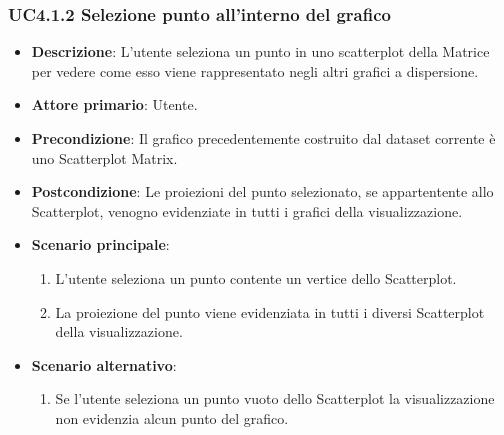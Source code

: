 \subsubsection{UC4.1.2 Selezione punto all'interno del grafico}
\label{subsec:uc4.1.1}
\begin{itemize}
    \item \textbf{Descrizione}: L'utente seleziona un punto in uno scatterplot della Matrice per vedere come 
                                esso viene rappresentato negli altri grafici a dispersione.
	
    \item \textbf{Attore primario}: Utente.
    
    \item \textbf{Precondizione}:   Il grafico precedentemente costruito dal dataset corrente è uno Scatterplot Matrix.
    \item \textbf{Postcondizione}:  Le proiezioni del punto selezionato, se appartentente allo Scatterplot, 
                                    venogno evidenziate in tutti i grafici della visualizzazione.

	\item \textbf{Scenario principale}:
        \begin{enumerate}
            \item L'utente seleziona un punto contente un vertice dello Scatterplot.
            \item La proiezione del punto viene evidenziata in tutti i diversi Scatterplot della visualizzazione.
        \end{enumerate}

    \item \textbf{Scenario alternativo}:
        \begin{enumerate}
            \item Se l'utente seleziona un punto vuoto dello Scatterplot la visualizzazione non evidenzia alcun punto del grafico.
        \end{enumerate}

\end{itemize}



